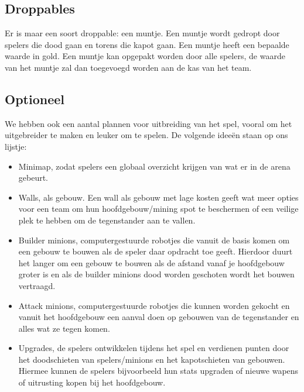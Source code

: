 \subsection{Droppables}
Er is maar een soort droppable: een muntje. Een muntje wordt gedropt door spelers die dood gaan en torens die kapot gaan. Een muntje heeft een bepaalde waarde in gold. Een muntje kan opgepakt worden door alle spelers, de waarde van het muntje zal dan toegevoegd worden aan de kas van het team.

\subsection{Optioneel}
We hebben ook een aantal plannen voor uitbreiding van het spel, vooral om het uitgebreider te maken en leuker om te spelen. De volgende idee\"en staan op ons lijstje: 
\begin{itemize}
  \item Minimap, zodat spelers een globaal overzicht krijgen van wat er in de arena gebeurt.
  \item Walls, als gebouw. Een wall als gebouw met lage kosten geeft wat meer opties voor een team om hun hoofdgebouw/mining spot te beschermen of een veilige plek te hebben om de tegenstander aan te vallen.
  \item Builder minions, computergestuurde robotjes die vanuit de basis komen om een gebouw te bouwen als de speler daar opdracht toe geeft. Hierdoor
duurt het langer om een gebouw te bouwen als de afstand vanaf je hoofdgebouw groter is en als de builder minions dood worden geschoten wordt het bouwen vertraagd.
  \item Attack minions, computergestuurde robotjes die kunnen worden gekocht en vanuit het hoofdgebouw een aanval doen op gebouwen van de tegenstander en alles wat ze tegen komen.
  \item Upgrades, de spelers ontwikkelen tijdens het spel en verdienen punten door het doodschieten van spelers/minions en het kapotschieten van gebouwen. Hiermee kunnen de spelers bijvoorbeeld hun stats upgraden of nieuwe wapens of uitrusting kopen bij het hoofdgebouw.
\end{itemize}
